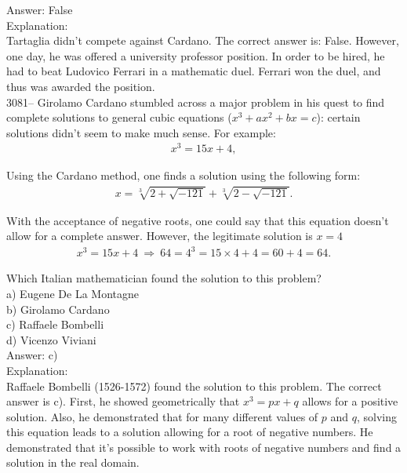 \documentclass[letterpaper, 12pt]{article}
\begin{document}
Answer: False\\

Explanation:\\
Tartaglia didn't compete against Cardano. The correct answer is: False. However, one day, he was offered a university professor position. In order to be hired, he had to beat Ludovico Ferrari in a mathematic duel. Ferrari won the duel, and thus was awarded the position.\\



3081-- Girolamo Cardano stumbled across a major problem in his quest to find complete solutions to general cubic equations ($x^{3} + ax^{2} + bx = c$): certain solutions didn't seem to make much sense. For example:
\begin{eqnarray*}
x^{3} = 15x + 4,
\end{eqnarray*}

Using the Cardano method, one finds a solution using the following form:
\begin{eqnarray*}
x = \sqrt[3]{2 + \sqrt{-121}} + \sqrt[3]{2 - \sqrt{-121}}.
\end{eqnarray*}

With the acceptance of negative roots, one could say that this equation doesn't allow for a complete answer. However, the legitimate solution is $x = 4$
\begin{eqnarray*}
x^{3} = 15x + 4 \ \Rightarrow \ 64 = 4^{3} = 15 \times 4 + 4 = 60 + 4 = 64.
\end{eqnarray*}

Which Italian mathematician found the solution to this problem?\\

a) Eugene De La Montagne\\
b) Girolamo Cardano\\
c) Raffaele Bombelli\\
d) Vicenzo Viviani\\

Answer: c)\\

Explanation:\\
Raffaele Bombelli (1526-1572) found the solution to this problem. The correct answer is c). First, he showed geometrically that $x^{3} = px + q$ allows for a positive solution. Also, he demonstrated that for many different values of $p$ and $q$, solving this equation leads to a solution allowing for a root of negative numbers. He demonstrated that it's possible to work with roots of negative numbers and find a solution in the real domain.\\
\end{document}
